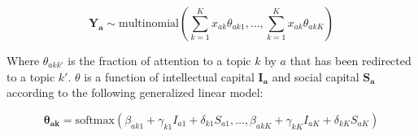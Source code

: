 \documentclass{article}
\begin{document}
\begin{equation}
    \bm{Y_a} \sim \text{multinomial}(\sum_{k=1}^{K} x_{ak}\theta_{ak1} ,\dots,\sum_{k=1}^{K}x_{ak}\theta_{akK})
\end{equation}

Where $\theta_{akk'}$ is the fraction of attention to a topic $k$ by $a$ that has been redirected to a topic $k'$. %
$\theta$ is a function of intellectual capital $\bm{I_a}$ and social capital $\bm{S_a}$ according to the following generalized linear model:

\begin{equation}
    \bm{\theta_{ak}} = \text{softmax}\left(\beta_{ak1} + \gamma_{k1} I_{a1} + \delta_{k1} S_{a1}, \dots,\beta_{akK} + \gamma_{kK} I_{aK} + \delta_{kK} S_{aK}\right)
    \label{eq:glm}
\end{equation}
\end{document}
